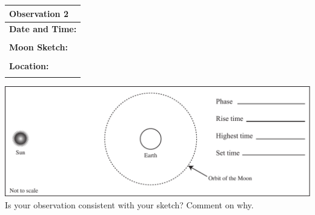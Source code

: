 \documentclass[11pt]{article}
\begin{document}
\noindent
\begin{minipage}{4.5cm}
\begin{center}
\begin{tabular}{|l|}
\hline 
 \textbf{Observation 2}
 \\
 \hline\hline
\textbf{Date and Time:}\quad\quad\quad\quad\\
\parbox{0.3\linewidth}{\vspace*{1cm}\hspace*{4cm}}
\\
\textbf{Moon Sketch:} \\
\parbox{0.3\linewidth}{\vspace*{3.5cm}\hspace*{4cm}}
\\
\textbf{Location:} \\
\parbox{0.3\linewidth}{\vspace*{1cm}\hspace*{4cm}}
\\\hline
\end{tabular}
\end{center}
\end{minipage}
\begin{minipage}{0.75\textwidth}
\includegraphics[width=\textwidth]{moon_position_in_orbit_blank}\\
\vspace*{0.5cm}
Is your observation consistent with your sketch? Comment on why.\\

\vspace*{1cm}
\hrulefill
\end{minipage}
\end{document}
